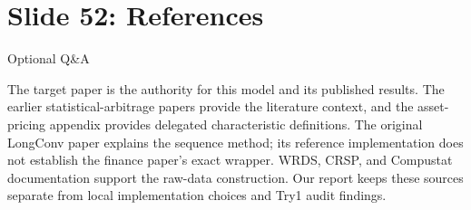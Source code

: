 \documentclass[11pt]{article}
\begin{document}
\section*{Slide 52: References}

\textcolor{SBred}{Optional Q\&A}

The target paper is the authority for this model and its published results. The earlier statistical-arbitrage papers provide the literature context, and the asset-pricing appendix provides delegated characteristic definitions. The original LongConv paper explains the sequence method; its reference implementation does not establish the finance paper's exact wrapper. WRDS, CRSP, and Compustat documentation support the raw-data construction. Our report keeps these sources separate from local implementation choices and Try1 audit findings.
\end{document}
